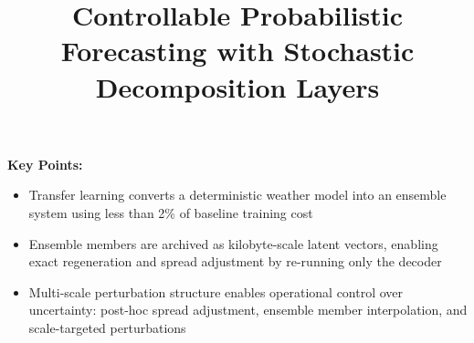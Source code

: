 \documentclass{agujournal2019}
\begin{document}
\title{Controllable Probabilistic Forecasting with Stochastic Decomposition Layers}




\textbf{Key Points:}
\begin{itemize}
\item Transfer learning converts a deterministic weather model into an ensemble system using less than 2\% of baseline training cost
\item Ensemble members are archived as kilobyte-scale latent vectors, enabling exact regeneration and spread adjustment by re-running only the decoder
\item Multi-scale perturbation structure enables operational control over uncertainty: post-hoc spread adjustment, ensemble member interpolation, and scale-targeted perturbations
\end{itemize}
\end{document}
